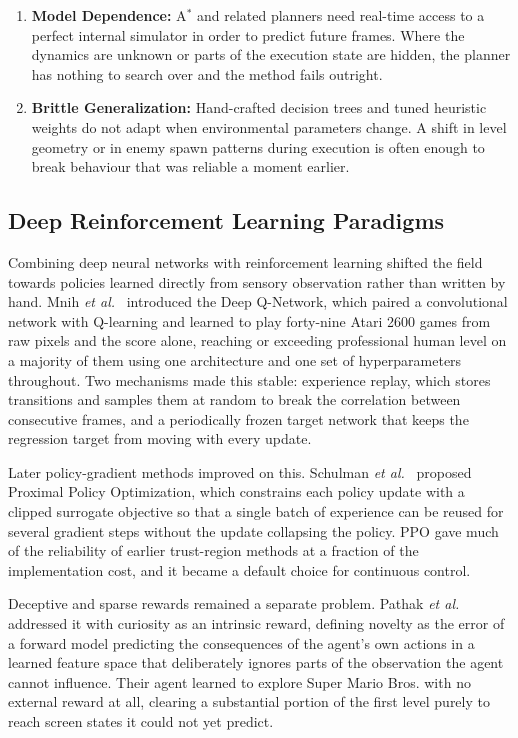 \begin{enumerate}
    \item \textbf{Model Dependence:} A$^*$ and related planners need real-time
    access to a perfect internal simulator in order to predict future frames.
    Where the dynamics are unknown or parts of the execution state are hidden,
    the planner has nothing to search over and the method fails outright.

    \item \textbf{Brittle Generalization:} Hand-crafted decision trees and
    tuned heuristic weights do not adapt when environmental parameters change.
    A shift in level geometry or in enemy spawn patterns during execution is
    often enough to break behaviour that was reliable a moment earlier.
\end{enumerate}

\subsection{Deep Reinforcement Learning Paradigms}
\label{subsec:lit-2}

Combining deep neural networks with reinforcement learning shifted the field
towards policies learned directly from sensory observation rather than written
by hand. Mnih \emph{et al.}~\cite{mnih2015} introduced the Deep Q-Network, which paired a
convolutional network with Q-learning and learned to play forty-nine Atari 2600
games from raw pixels and the score alone, reaching or exceeding professional
human level on a majority of them using one architecture and one set of
hyperparameters throughout. Two mechanisms made this stable: experience replay,
which stores transitions and samples them at random to break the correlation
between consecutive frames, and a periodically frozen target network that keeps
the regression target from moving with every update.

\noindent
Later policy-gradient methods improved on this. Schulman \emph{et al.}~\cite{schulman2017} proposed
Proximal Policy Optimization, which constrains each policy update with a clipped
surrogate objective so that a single batch of experience can be reused for
several gradient steps without the update collapsing the policy. PPO gave much
of the reliability of earlier trust-region methods at a fraction of the
implementation cost, and it became a default choice for continuous control.

\noindent
Deceptive and sparse rewards remained a separate problem. Pathak \emph{et al.}~\cite{pathak2017}
addressed it with curiosity as an intrinsic reward, defining novelty as the
error of a forward model predicting the consequences of the agent's own actions
in a learned feature space that deliberately ignores parts of the observation
the agent cannot influence. Their agent learned to explore Super Mario Bros.
with no external reward at all, clearing a substantial portion of the first
level purely to reach screen states it could not yet predict.

